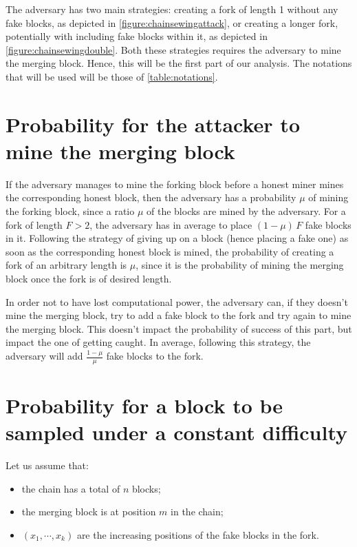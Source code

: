       The adversary has two main strategies: creating a fork of length 1 without any fake blocks, as depicted in \autoref{figure:chainsewingattack}, or creating a longer fork, potentially with including fake blocks within it, as depicted in \autoref{figure:chainsewingdouble}. Both these strategies requires the adversary to mine the merging block. Hence, this will be the first part of our analysis. The notations that will be used will be those of \autoref{table:notations}.
      
      \section{Probability for the attacker to mine the merging block}
        If the adversary manages to mine the forking block before a honest miner mines the corresponding honest block, then the adversary has a probability \(\mu\) of mining the forking block, since a ratio \(\mu\) of the blocks are mined by the adversary. For a fork of length \(F>2\), the adversary has in average to place \((1-\mu)\,F\) fake blocks in it. Following the strategy of giving up on a block (hence placing a fake one) as soon as the corresponding honest block is mined, the probability of creating a fork of an arbitrary length is \(\mu\), since it is the probability of mining the merging block once the fork is of desired length.
        
        In order not to have lost computational power, the adversary can, if they doesn't mine the merging block, try to add a fake block to the fork and try again to mine the merging block. This doesn't impact the probability of success of this part, but impact the one of getting caught. In average, following this strategy, the adversary will add \(\frac{1-\mu}{\mu}\) fake blocks to the fork.

      \section{Probability for a block to be sampled under a constant difficulty}
        Let us assume that:
        \begin{itemize}
          \item the chain has a total of \(n\) blocks;
          \item the merging block is at position \(m\) in the chain;
          \item \((x_1,\cdots,x_k)\) are the increasing positions of the fake blocks in the fork.
        \end{itemize}
        
